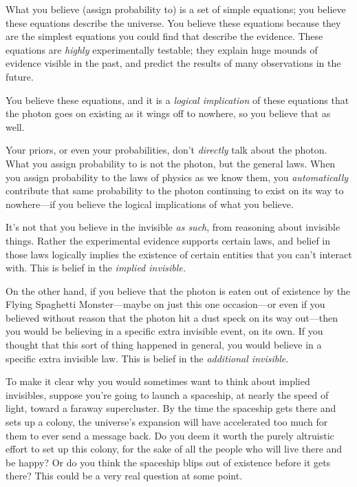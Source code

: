 {
 What you believe (assign probability to) is a set of simple
equations; you believe these equations describe the universe. You
believe these equations because they are the simplest equations you
could find that describe the evidence. These equations are
\textit{highly} experimentally testable; they explain huge mounds of
evidence visible in the past, and predict the results of many
observations in the future.}

{
 You believe these equations, and it is a \textit{logical
implication} of these equations that the photon goes on existing as it
wings off to nowhere, so you believe that as well.}

{
 Your priors, or even your probabilities, don't
\textit{directly} talk about the photon. What you assign probability to
is not the photon, but the general laws. When you assign probability to
the laws of physics as we know them, you \textit{automatically}
contribute that same probability to the photon continuing to exist on
its way to nowhere---if you believe the logical implications of what
you believe.}

{
 It's not that you believe in the invisible
\textit{as such}, from reasoning about invisible things. Rather the
experimental evidence supports certain laws, and belief in those laws
logically implies the existence of certain entities that you
can't interact with. This is belief in the
\textit{implied invisible.}}

{
 On the other hand, if you believe that the photon is eaten out of
existence by the Flying Spaghetti Monster---maybe on just this one
occasion---or even if you believed without reason that the photon hit a
dust speck on its way out---then you would be believing in a specific
extra invisible event, on its own. If you thought that this sort of
thing happened in general, you would believe in a specific extra
invisible law. This is belief in the \textit{additional invisible}.}

{
 To make it clear why you would sometimes want to think about
implied invisibles, suppose you're going to launch a
spaceship, at nearly the speed of light, toward a faraway supercluster.
By the time the spaceship gets there and sets up a colony, the
universe's expansion will have accelerated too much for
them to ever send a message back. Do you deem it worth the purely
altruistic effort to set up this colony, for the sake of all the people
who will live there and be happy? Or do you think the spaceship blips
out of existence before it gets there? This could be a very real
question at some point.}

